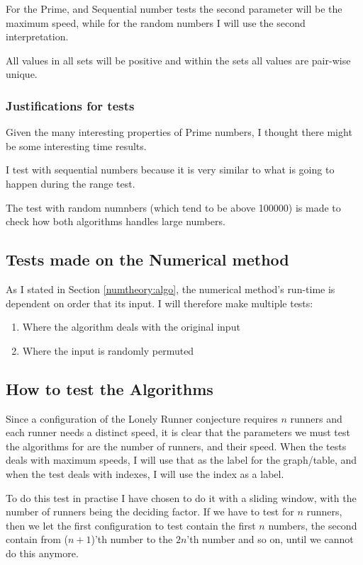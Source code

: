 For the Prime, and Sequential number tests the second parameter will be the maximum speed, while for the random numbers I will use the second interpretation.

All values in all sets will be positive and within the sets all values are pair-wise unique.

\subsubsection{Justifications for tests}

Given the many interesting properties of Prime numbers, I thought there might be some interesting time results. 

I test with sequential numbers because it is very similar to what is going to happen during the range test. 

The test with random numnbers (which tend to be above 100000) is made to check how both algorithms handles large numbers.

\subsection{Tests made on the Numerical method}
As I stated in Section \ref{numtheory:algo}, the numerical
method's run-time is dependent on order that its input. I will
therefore make multiple tests:
\begin{enumerate}
\item Where the algorithm deals with the original input
\item Where the input is randomly permuted
\end{enumerate} 

\subsection{How to test the Algorithms}
Since a configuration of the Lonely Runner conjecture requires $n$ runners and each runner needs a distinct speed, it is clear that the parameters we must test the algorithms for are the number of runners, and their speed. When the tests deals with maximum speeds, I will use that as the label for the graph/table, and when the test deals with indexes, I will use the index as a label.

To do this test in practise I have chosen to do it with a sliding window, with the number of runners being the deciding factor. If we have to test for $n$ runners, then we let the first configuration to test contain the first $n$ numbers, the second contain from ($n+1$)'th number to the $2n$'th number and so on, until we cannot do this anymore.


